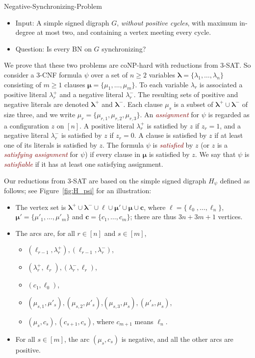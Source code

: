 \documentclass[11pt,letter]{article}
\newcommand{\EM}[1]{{\em\textcolor{Maroon}{#1}}}
\newcommand{\LAMBDA}{\boldsymbol{\lambda}}
\newcommand{\MU}{\boldsymbol{\mu}}
\newcommand{\ELL}{\boldsymbol{\ell}}
\newcommand{\C}{\boldsymbol{c}}
\begin{document}
\bigskip
\begin{minipage}{13.5cm}
{\sc Negative-Synchronizing-Problem}
\begin{itemize}
\item
{\sc Input:} A simple signed digraph $G$, {\em without positive cycles}, with maximum in-degree at most two, and containing a vertex meeting every cycle.
\item
{\sc Question:} Is every BN on $G$ synchronizing?
\end{itemize}
\end{minipage}

\bigskip
We prove that these two problems are coNP-hard with reductions from 3-SAT. So consider a 3-CNF formula $\psi$ over a set of $n\geq 2$ variables $\LAMBDA=\{\lambda_1,\dots,\lambda_n\}$ consisting of $m\geq 1$ clauses $\MU=\{\mu_1,\dots,\mu_m\}$. To each variable $\lambda_r$ is associated a positive literal $\lambda^+_r$ and a negative literal $\lambda^-_r$. The resulting sets of positive and negative literals are denoted $\LAMBDA^+$ and $\LAMBDA^-$. Each clause $\mu_s$ is a subset of $\LAMBDA^+\cup\LAMBDA^-$ of size three, and we write $\mu_r=\{\mu_{r,1},\mu_{r,2},\mu_{r,3}\}$. An \EM{assignment} for $\psi$ is regarded as a configuration $z$ on $[n]$. A positive literal $\lambda^+_r$ is satisfied by $z$ if $z_r=1$, and a negative literal $\lambda^-_r$ is satisfied by $z$ if $z_r=0$. A clause is satisfied by $z$ if at least one of its literals is satisfied by $z$. The formula $\psi$ is \EM{satisfied} by $z$ (or $z$ is a \EM{satisfying assignment} for $\psi$) if every clause in $\MU$ is satisfied by $z$. We say that $\psi$ is \EM{satisfiable} if it has at least one satisfying assignment. 

\medskip
Our reductions from 3-SAT are based on the simple signed digraph $H_\psi$ defined as follows; see Figure~\ref{fig:H_psi} for an illustration:
\begin{itemize}
\item
The vertex set is $\LAMBDA^+\cup\LAMBDA^-\cup\ELL\cup \MU'\cup\MU\cup \C$, 
where $\ELL=\{\ell_0,\dots,\ell_n\}$, $\MU'=\{\mu'_1,\dots,\mu'_m\}$ and $\C=\{c_1,\dots,c_m\}$; there are thus $3n+3m+1$ vertices. 
\item The arcs are,	 for all $r\in [n]$ and $s\in [m]$, 
\begin{itemize}
\item
$(\ell_{r-1},\lambda^+_r),(\ell_{r-1},\lambda^-_r)$, 
\item
$(\lambda^+_r,\ell_r),(\lambda^-_r,\ell_r)$,
\item
$(c_1,\ell_0)$,
\item
$(\mu_{s,1},\mu'_s),(\mu_{s,2},\mu'_s)$,$(\mu_{s,3},\mu_s),(\mu'_s,\mu_s)$,
\item
$(\mu_s,c_s),(c_{s+1},c_s)$, where $c_{m+1}$ means $\ell_n$.
\end{itemize} 
\item
For all $s\in [m]$, the arc $(\mu_s,c_s)$ is negative, and all the other arcs are positive. 
\end{itemize}
\end{document}
